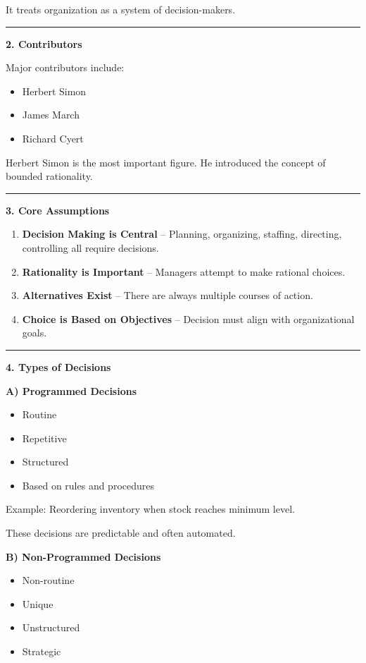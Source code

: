 \documentclass[10pt,a4paper]{article}
\newcommand{\separator}{\vspace{0.4em}\noindent\rule{\linewidth}{0.6pt}\vspace{0.4em}}
\begin{document}
It treats organization as a system of decision-makers.

\separator

\textbf{2. Contributors}

Major contributors include:
\begin{itemize}
  \item Herbert Simon
  \item James March
  \item Richard Cyert
\end{itemize}

Herbert Simon is the most important figure. He introduced the concept of bounded
rationality.

\separator

\textbf{3. Core Assumptions}

\begin{enumerate}
  \item \textbf{Decision Making is Central} -- Planning, organizing, staffing, directing, controlling all require decisions.
  \item \textbf{Rationality is Important} -- Managers attempt to make rational choices.
  \item \textbf{Alternatives Exist} -- There are always multiple courses of action.
  \item \textbf{Choice is Based on Objectives} -- Decision must align with organizational goals.
\end{enumerate}

\separator

\textbf{4. Types of Decisions}

\textbf{A) Programmed Decisions}
\begin{itemize}
  \item Routine
  \item Repetitive
  \item Structured
  \item Based on rules and procedures
\end{itemize}

Example: Reordering inventory when stock reaches minimum level.

These decisions are predictable and often automated.

\textbf{B) Non-Programmed Decisions}
\begin{itemize}
  \item Non-routine
  \item Unique
  \item Unstructured
  \item Strategic
\end{itemize}
\end{document}
